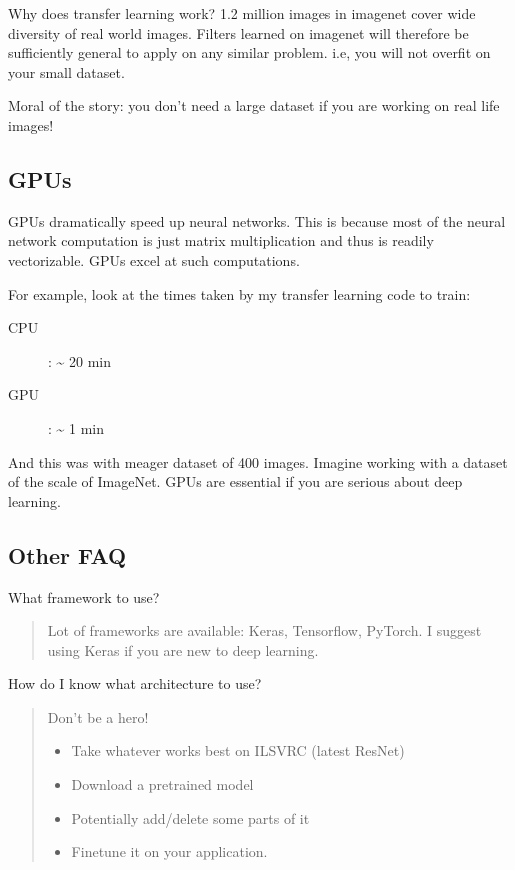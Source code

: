 \documentclass[a4paper]{tufte-handout}
\begin{document}
Why does transfer learning work? 1.2 million images in imagenet cover
wide diversity of real world images. Filters learned on imagenet will
therefore be sufficiently general to apply on any similar problem. i.e,
you will not overfit on your small dataset.

Moral of the story: you don't need a large dataset if you are working on
real life images!

\subsection{GPUs}\label{gpus}

GPUs dramatically speed up neural networks. This is because most of the
neural network computation is just matrix multiplication and thus is
readily vectorizable. GPUs excel at such computations.

For example, look at the times taken by my transfer learning code to
train:

\begin{description}
\item[CPU]: \textasciitilde{} 20 min
\item[GPU]: \textasciitilde{} 1 min
\end{description}

And this was with meager dataset of 400 images. Imagine working with a
dataset of the scale of ImageNet. GPUs are essential if you are serious
about deep learning.

\subsection{Other FAQ}\label{other-faq}

\noindent What framework to use?

\begin{quote}
Lot of frameworks are available: Keras, Tensorflow, PyTorch. I suggest
using Keras if you are new to deep learning.
\end{quote}

\noindent How do I know what architecture to use?

\begin{quote}
Don't be a hero!

\begin{itemize}
\item
  Take whatever works best on ILSVRC (latest ResNet)
\item
  Download a pretrained model
\item
  Potentially add/delete some parts of it
\item
  Finetune it on your application.
\end{itemize}
\end{quote}
\end{document}
